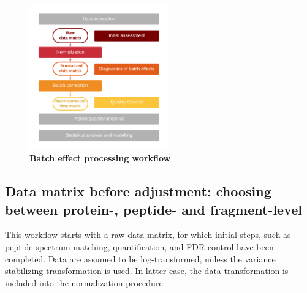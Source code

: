 \documentclass[num-refs]{wiley-article}
\begin{document}
\begin{figure}[bt]
	\center
	\includegraphics[width=6cm]{figures/Fig0_workflow_staircase}
	\caption[Batch effect correction workflow]
	{\textbf{Batch effect processing workflow}}
	\label{fig:batch_fig1_workflow}
\end{figure}


\subsection{Data matrix before adjustment: choosing between protein-, peptide- and fragment-level}


This workflow starts with a raw data matrix, for which initial steps, such as peptide-spectrum matching, quantification, and FDR control have been completed. Data are assumed to be log-transformed, unless the variance stabilizing transformation \cite{Durbin2002} is used. In latter case, the data transformation is included into the normalization procedure. 
\end{document}
